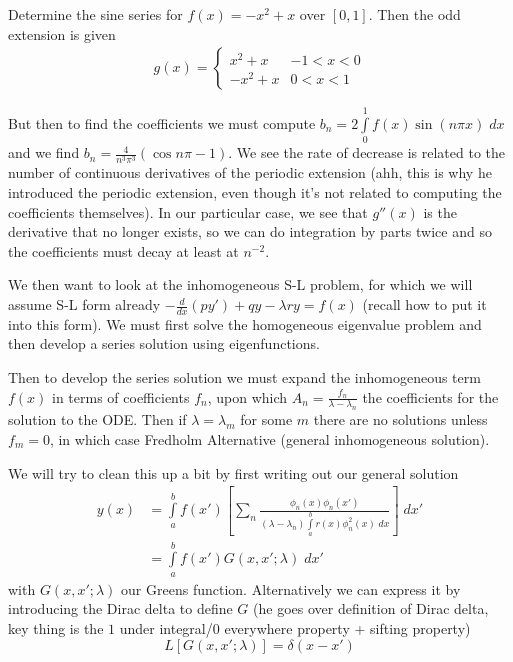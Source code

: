 \documentclass[10pt]{report}
\newcommand{\rd}[2]{\frac{d#1}{d#2}}
\begin{document}
Determine the sine series for $f(x) = -x^2 + x$ over $[0,1]$. Then the odd extension is given
\begin{align}
    g(x) = \begin{cases}x^2 + x & -1 < x < 0\\
        -x^2 + x & 0 < x < 1\end{cases}
\end{align}

But then to find the coefficients we must compute $b_n = 2\displaystyle\int\limits_{0}^{1}f(x)\sin(n\pi x)\;dx$ and we find $b_n =\frac{4}{n^3\pi^3}\left( \cos n\pi - 1 \right)$. We see the rate of decrease is related to the number of continuous derivatives of the periodic extension (ahh, this is why he introduced the periodic extension, even though it's not related to computing the coefficients themselves). In our particular case, we see that $g''(x)$ is the derivative that no longer exists, so we can do integration by parts twice and so the coefficients must decay at least at $n^{-2}$.   

We then want to look at the inhomogeneous S-L problem, for which we will assume S-L form already $-\rd{}{x}(py') + qy - \lambda ry = f(x)$ (recall how to put it into this form). We must first solve the homogeneous eigenvalue problem and then develop a series solution using eigenfunctions. 

Then to develop the series solution we must expand the inhomogeneous term $f(x)$ in terms of coefficients $f_n$, upon which $A_n = \frac{f_n}{\lambda - \lambda_n}$ the coefficients for the solution to the ODE. Then if $\lambda = \lambda_m$ for some $m$ there are no solutions unless $f_m = 0$, in which case Fredholm Alternative (general inhomogeneous solution). 

We will try to clean this up a bit by first writing out our general solution
\begin{align}
    y(x) &= \displaystyle\int\limits_{a}^{b}f(x')\left[ \sum_{n}^{}\frac{\phi_n(x)\phi_n(x')}{(\lambda - \lambda_n)\displaystyle\int\limits_{a}^{b}r(x)\phi_n^2(x)\;dx} \right]\;dx'\\
    &= \displaystyle\int\limits_{a}^{b}f(x')G(x,x';\lambda)\;dx'
\end{align}
with $G(x,x';\lambda)$ our Greens function. Alternatively we can express it by introducing the Dirac delta to define $G$ (he goes over definition of Dirac delta, key thing is the $1$ under integral/$0$ everywhere property + sifting property)
\begin{equation}
    L[G(x,x';\lambda)] = \delta(x-x')
\end{equation}
\end{document}
